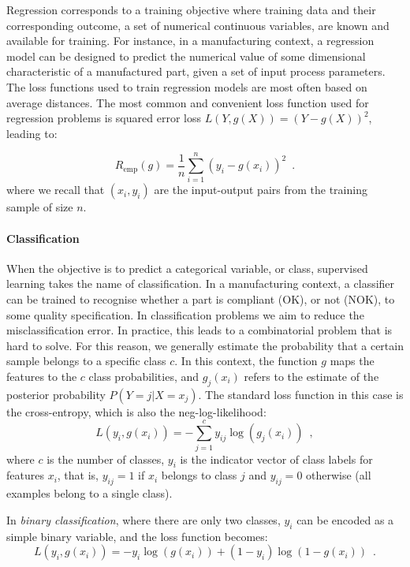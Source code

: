 Regression corresponds to a training objective where training data and their corresponding outcome, a set of numerical continuous variables, are known and available for training. For instance, in a manufacturing context, a regression model can be designed to predict the numerical value of some dimensional characteristic of a manufactured part, given a set of input process parameters. The loss functions used to train regression models are most often based on average distances. The most common and convenient loss function used for regression problems is squared error loss $L(Y, g(X))=(Y-g(X))^2$, leading to:

\begin{equation*}
    R_\mathrm{emp}(g) = \frac{1}{n}\sum_{i=1}^{n}(y_i - g(x_i))^2
    \enspace.
\end{equation*}
where we recall that $(x_i,y_i)$ are the input-output pairs from the training sample of size $n$. 


\paragraph{Classification} \label{Classification}

When the objective is to predict a categorical variable, or class, supervised learning takes the name of classification. In a manufacturing context, a classifier can be trained to recognise whether a part is compliant (OK), or not (NOK), to some quality specification. In classification problems we aim to reduce the misclassification error. In practice, this leads to a combinatorial problem that is hard to solve. For this reason, we generally estimate the probability that a certain sample belongs to a specific class $c$. In this context, the function $g$ maps the features to the $c$ class probabilities, and $g_j(x_i)$ refers to the estimate of the posterior probability $P(Y=j|X=x_j)$. The standard loss function in this case is the cross-entropy, which is also the neg-log-likelihood: 
\begin{equation*}
    L(y_i, g(x_i)) = - \sum_{j=1}^c y_{ij}\log(g_j(x_i))
    \enspace,
\end{equation*}
where $c$ is the number of classes, $y_i$ is the indicator vector of class labels for features $x_i$, that is, $y_{ij}=1$ if $x_i$ belongs to class $j$ and $y_{ij}=0$ otherwise (all examples belong to a single class).

In \textit{binary classification}, where there are only two classes, $y_i$ can be encoded as a simple binary variable, and the loss function becomes:
\begin{equation*}
    L(y_i, g(x_i)) = - y_i \log(g(x_i)) + (1-y_i) \log(1-g(x_i))
    \enspace.
\end{equation*}

